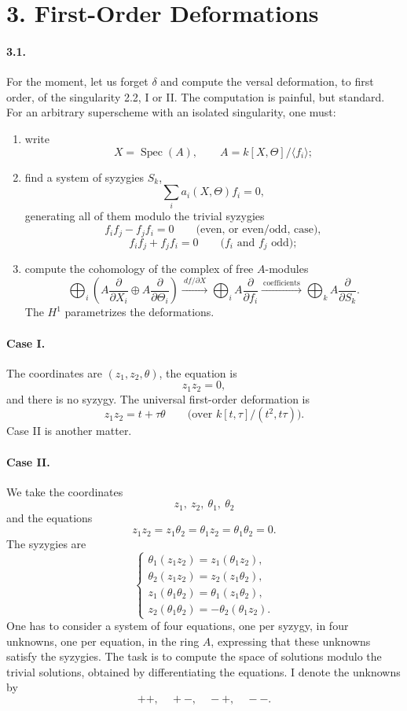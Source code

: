 \documentclass[11pt]{article}
\newcommand{\Spec}{\operatorname{Spec}}
\begin{document}
\section*{3. First-Order Deformations}

\paragraph{3.1.}
For the moment, let us forget $\delta$ and compute the versal deformation, to first order, of the singularity 2.2, I or II. The computation is painful, but standard. For an arbitrary superscheme with an isolated singularity, one must:

\begin{enumerate}
\item[(a)] write
\[
  X=\Spec(A),\qquad A=k[X,\Theta]/\langle f_i\rangle ;
\]
\item[(b)] find a system of syzygies $S_k$,
\[
  \sum_i a_i(X,\Theta)f_i=0,
\]
generating all of them modulo the trivial syzygies
\[
  f_i f_j-f_j f_i=0\qquad\text{(even, or even/odd, case)},
\]
\[
  f_i f_j+f_j f_i=0\qquad\text{($f_i$ and $f_j$ odd)};
\]
\item[(c)] compute the cohomology of the complex of free $A$-modules
\[
  \bigoplus_i\left(A\frac{\partial}{\partial X_i}\oplus
  A\frac{\partial}{\partial\Theta_i}\right)
  \xrightarrow{\ df/\partial X\ }
  \bigoplus_i A\frac{\partial}{\partial f_i}
  \xrightarrow{\ \text{coefficients}\ }
  \bigoplus_k A\frac{\partial}{\partial S_k}.
\]
The $H^1$ parametrizes the deformations.
\end{enumerate}

\paragraph{Case I.}
The coordinates are $(z_1,z_2,\theta)$, the equation is
\[
  z_1z_2=0,
\]
and there is no syzygy. The universal first-order deformation is
\[
  z_1z_2=t+\tau\theta
  \qquad\bigl(\text{over }k[t,\tau]/(t^2,t\tau)\bigr).
\]
Case II is another matter.

\paragraph{Case II.}
We take the coordinates
\[
  z_1,\ z_2,\ \theta_1,\ \theta_2
\]
and the equations
\[
  z_1z_2=z_1\theta_2=\theta_1z_2=\theta_1\theta_2=0.
\]
The syzygies are
\[
\begin{cases}
\theta_1(z_1z_2)=z_1(\theta_1z_2),\\
\theta_2(z_1z_2)=z_2(z_1\theta_2),\\
z_1(\theta_1\theta_2)=\theta_1(z_1\theta_2),\\
z_2(\theta_1\theta_2)=-\theta_2(\theta_1z_2).
\end{cases}
\]
One has to consider a system of four equations, one per syzygy, in four unknowns, one per equation, in the ring $A$, expressing that these unknowns satisfy the syzygies. The task is to compute the space of solutions modulo the trivial solutions, obtained by differentiating the equations. I denote the unknowns by
\[
  ++,\quad +-,\quad -+,\quad --.
\]
\end{document}
